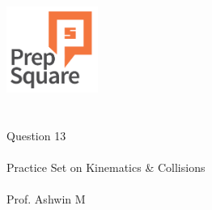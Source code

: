 \documentclass{beamer}
\begin{document}
\begin{center}
\ \\ \ \\
\includegraphics[width=30mm]{Logo-final.png} \\
\ \\ \ \\ 
{\huge Question 13 \\ \ \\ }
{\Large
Practice Set on Kinematics \& Collisions
}
{\large \ \\ \ \\ Prof. Ashwin M }
\end{center}
\end{document}
